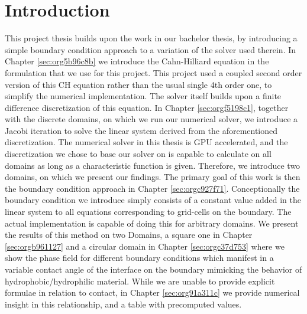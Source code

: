 \documentclass{mimosis}
\begin{document}
\chapter{Introduction}
\label{sec:org969f3e6}
This project thesis builds upon the work in our bachelor thesis, by introducing a simple boundary condition approach to a variation of the solver used therein. In Chapter \ref{sec:org5b96c8b} we introduce the Cahn-Hilliard equation in the formulation that we use for this project. This project used a coupled second order version of this CH equation rather than the usual single 4th order one, to simplify the numerical implementation. The solver itself builds upon a finite difference discretization of this equation. In Chapter \ref{sec:orgf5198c1}, together with the discrete domains, on which we run our numerical solver, we introduce a Jacobi iteration to solve the linear system derived from the aforementioned discretization.  The numerical solver in this thesis is GPU accelerated, and the discretization we chose to base our solver on is capable to calculate on all domains as long as a characteristic function is given. Therefore, we introduce two domains, on which we present our findings. The primary goal of this work is then the boundary condition approach in Chapter \ref{sec:orgc927f71}. Conceptionally the boundary condition we introduce simply consists of a constant value added in the linear system to all equations corresponding to grid-cells on the boundary. The actual implementation is capable of doing this for arbitrary domains. We present the results of this method on two Domains, a square one in Chapter \ref{sec:orgb961127} and a circular domain in Chapter \ref{sec:orgc37d753} where we show the phase field for different boundary conditions which manifest in a variable contact angle of the interface on the boundary mimicking the behavior of hydrophobic/hydrophilic material. While we are unable to provide explicit formulae in relation to contact, in Chapter \ref{sec:org91a311c} we provide numerical insight in this relationship, and a table with precomputed values.
\end{document}
